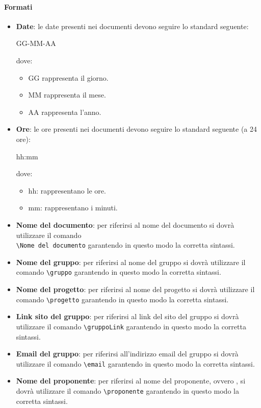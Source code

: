 \paragraph{Formati}
\begin{itemize}
   \item \textbf{Date}: le date presenti nei documenti devono seguire lo standard seguente:
   \begin{center}
     GG-MM-AA
   \end{center}
   dove:
   \begin{itemize}
   		\item GG rappresenta il giorno.
     	\item MM rappresenta il mese.
     	\item AA rappresenta l'anno.
   \end{itemize}
   \item \textbf{Ore}: le ore presenti nei documenti devono seguire lo standard seguente (a 24 ore):
   \begin{center}
     hh:mm
   \end{center}
   dove:
   \begin{itemize}
     \item hh: rappresentano le ore.
     \item mm: rappresentano i minuti.
   \end{itemize}
   \item \textbf{Nome del documento}: per riferirsi al nome del documento si
   dovrà utilizzare il comando  \\ \verb|\Nome del documento| garantendo in questo modo la corretta sintassi.
   \item \textbf{Nome del gruppo}: per riferirsi al nome del gruppo si dovrà
   utilizzare il comando  \verb|\gruppo| garantendo in questo modo la corretta sintassi.
   \item \textbf{Nome del progetto}: per riferirsi al nome del progetto si dovrà
   utilizzare il comando  \verb|\progetto| garantendo in questo modo la corretta sintassi.
   \item \textbf{Link sito del gruppo}: per riferirsi al link del sito del gruppo si dovrà
   utilizzare il comando  \verb|\gruppoLink| garantendo in questo modo la corretta sintassi.
   \item \textbf{Email del gruppo}: per riferirsi all'indirizzo email del gruppo si dovrà
   utilizzare il comando  \verb|\email| garantendo in questo modo la corretta sintassi.
   \item \textbf{Nome del proponente}: per riferirsi al nome del proponente, ovvero \proponente, si dovrà
   utilizzare il comando   \verb|\proponente| garantendo in questo modo la corretta
   sintassi.
\end{itemize}

